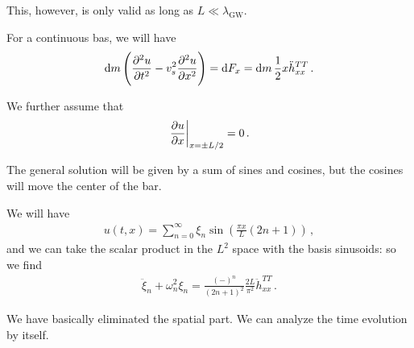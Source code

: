 \documentclass[main.tex]{subfiles}
\begin{document}
This, however, is only valid as long as \(L \ll \lambda _{\text{GW}}\). 

For a continuous bas, we will have 
%
\begin{align}
\dd{m} \qty(\pdv[2]{u}{t} - v_s^2 \pdv[2]{u}{x}) = \dd{F_x} = \dd{m} \frac{1}{2} x \ddot{h}_{xx}^{TT}
\,.
\end{align}
%

We further assume that 
%
\begin{align}
\eval{\pdv{u}{x}}_{x = \pm L/2} = 0
\,.
\end{align}

The general solution will be given by a sum of sines and cosines, but the cosines will move the center of the bar. 

We will have 
%
\begin{align}
u(t, x) = \sum _{n=0}^{ \infty } \xi_{n} \sin( \frac{\pi x}{L} (2 n + 1))
\,,
\end{align}
%
and we can take the scalar product in the \(L^{2}\) space with the basis sinusoids: so we find 
%
\begin{align}
\ddot{\xi}_{n} + \omega^2_{n} \xi_{n} = \frac{(-)^{n}}{(2n+1)^2} \frac{2L}{\pi^2} \ddot{h}^{TT}_{xx}
\,.
\end{align}

We have basically eliminated the spatial part. 
We can analyze the time evolution by itself. 
\end{document}
